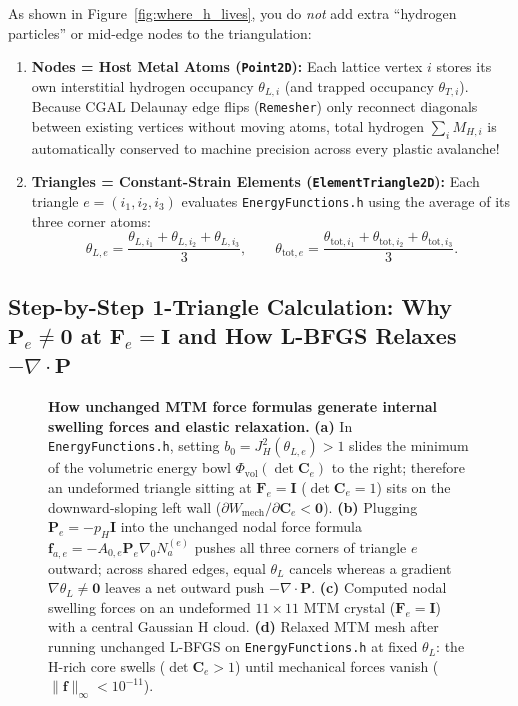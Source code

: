 \documentclass[11pt,a4paper]{article}
\newcommand{\code}[1]{\texttt{#1}}
\begin{document}
As shown in Figure~\ref{fig:where_h_lives}, you do \emph{not} add extra ``hydrogen particles'' or mid-edge nodes to the triangulation:
\begin{enumerate}[nosep]
  \item \textbf{Nodes = Host Metal Atoms (\code{Point2D}):} Each lattice vertex $i$ stores its own interstitial hydrogen occupancy $\theta_{L,i}$ (and trapped occupancy $\theta_{T,i}$). Because CGAL Delaunay edge flips (\code{Remesher}) only reconnect diagonals between existing vertices without moving atoms, total hydrogen $\sum_i M_{H,i}$ is automatically conserved to machine precision across every plastic avalanche!
  \item \textbf{Triangles = Constant-Strain Elements (\code{ElementTriangle2D}):} Each triangle $e = (i_1, i_2, i_3)$ evaluates \code{EnergyFunctions.h} using the average of its three corner atoms:
  \begin{equation}
    \theta_{L,e} = \frac{\theta_{L,i_1} + \theta_{L,i_2} + \theta_{L,i_3}}{3}, \qquad
    \theta_{\text{tot},e} = \frac{\theta_{\text{tot},i_1} + \theta_{\text{tot},i_2} + \theta_{\text{tot},i_3}}{3}.
  \end{equation}
\end{enumerate}

\newpage
\subsection{Step-by-Step 1-Triangle Calculation: Why \texorpdfstring{$\mathbf{P}_e \neq \mathbf{0}$}{P\_e != 0} at \texorpdfstring{$\mathbf{F}_e = \mathbf{I}$}{F\_e = I} and How L-BFGS Relaxes \texorpdfstring{$-\nabla\cdot\mathbf{P}$}{-div P}}

\begin{figure}[ht!]
\centering
\resizebox{\textwidth}{!}{}
\caption{\textbf{How unchanged MTM force formulas generate internal swelling forces and elastic relaxation.} \textbf{(a)} In \code{EnergyFunctions.h}, setting $b_0 = J_H^2(\theta_{L,e}) > 1$ slides the minimum of the volumetric energy bowl $\Phi_{\mathrm{vol}}(\det\mathbf{C}_e)$ to the right; therefore an undeformed triangle sitting at $\mathbf{F}_e=\mathbf{I}$ ($\det\mathbf{C}_e=1$) sits on the downward-sloping left wall ($\partial W_{\mathrm{mech}}/\partial\mathbf{C}_e < \mathbf{0}$). \textbf{(b)} Plugging $\mathbf{P}_e = -p_H\mathbf{I}$ into the unchanged nodal force formula $\mathbf{f}_{a,e}=-A_{0,e}\mathbf{P}_e\nabla_0 N_a^{(e)}$ pushes all three corners of triangle $e$ outward; across shared edges, equal $\theta_L$ cancels whereas a gradient $\nabla\theta_L \neq \mathbf{0}$ leaves a net outward push $-\nabla\cdot\mathbf{P}$. \textbf{(c)} Computed nodal swelling forces on an undeformed $11\times 11$ MTM crystal ($\mathbf{F}_e=\mathbf{I}$) with a central Gaussian H cloud. \textbf{(d)} Relaxed MTM mesh after running unchanged L-BFGS on \code{EnergyFunctions.h} at fixed $\theta_L$: the H-rich core swells ($\det\mathbf{C}_e > 1$) until mechanical forces vanish ($\|\mathbf{f}\|_\infty < 10^{-11}$).}
\label{fig:swelling_forces}
\end{figure}
\end{document}
